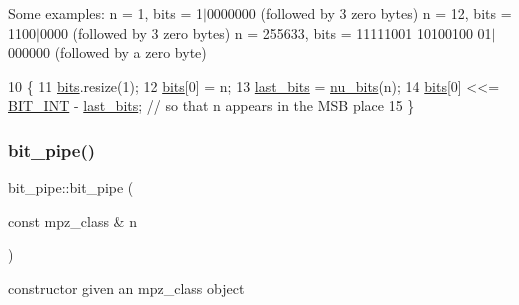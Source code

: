 Some examples\+: n = 1, bits = 1$\vert$0000000 (followed by 3 zero bytes) n = 12, bits = 1100$\vert$0000 (followed by 3 zero bytes) n = 255633, bits = 11111001 10100100 01$\vert$000000 (followed by a zero byte) 
\begin{DoxyCode}
10                                        \{
11   \hyperlink{classbit__pipe_a86f38af1e9736b053728033490476b50}{bits}.resize(1);
12   \hyperlink{classbit__pipe_a86f38af1e9736b053728033490476b50}{bits}[0] = n;
13   \hyperlink{classbit__pipe_a0f3e84b02751803adaab499b5dad86fe}{last\_bits} = \hyperlink{bitstream_8cpp_a9dfce6f51e3febb3973aa3b16c2fecb4}{nu\_bits}(n);
14   \hyperlink{classbit__pipe_a86f38af1e9736b053728033490476b50}{bits}[0] <<= \hyperlink{bitstream_8h_afcadf5aa65c5159bfb96c4d82ebc0a5d}{BIT\_INT} - \hyperlink{classbit__pipe_a0f3e84b02751803adaab499b5dad86fe}{last\_bits}; \textcolor{comment}{// so that n appears in the MSB place }
15 \}
\end{DoxyCode}
\mbox{\label{classbit__pipe_adc311ad05b01a2ec6e979882aa8b703e}} 
\subsubsection{\texorpdfstring{bit\+\_\+pipe()}{bit\_pipe()}\hspace{0.1cm}{\footnotesize\ttfamily [3/3]}}
{\footnotesize\ttfamily bit\+\_\+pipe\+::bit\+\_\+pipe (\begin{DoxyParamCaption}\item[{const mpz\+\_\+class \&}]{n }\end{DoxyParamCaption})}



constructor given an mpz\+\_\+class object 


